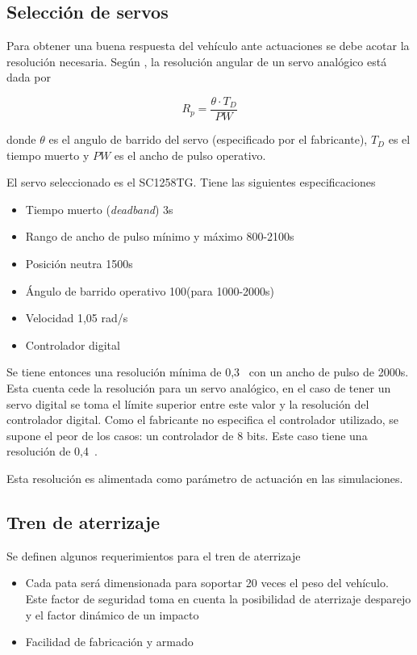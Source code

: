 \subsection{Selección de servos} \label{ssec:servoSeleccion}

Para obtener una buena respuesta del vehículo ante actuaciones se debe acotar la resolución necesaria. Según \cite{castillo2018efectos}, la resolución angular de un servo analógico está dada por


\[
R_p = \frac{\theta \cdot T_D}{PW}  
\]

donde $\theta$ es el angulo de barrido del servo (especificado por el fabricante), $T_D$ es el tiempo muerto y $PW$ es el ancho de pulso operativo. 

El servo seleccionado es el SC1258TG. Tiene las siguientes especificaciones

\begin{itemize}
    \item Tiempo muerto (\textit{deadband}) 3\micro s
    \item Rango de ancho de pulso mínimo y máximo 800-2100\micro s
    \item Posición neutra 1500\micro s
    \item Ángulo de barrido operativo 100\grad (para 1000-2000\micro s)
    \item Velocidad 1,05 rad/s
    \item Controlador digital
\end{itemize}

Se tiene entonces una resolución mínima de 0,3\grad~ con un ancho de pulso de 2000\micro s. Esta cuenta cede la resolución para un servo analógico, en el caso de tener un servo digital se toma el límite superior entre este valor y la resolución del controlador digital. Como el fabricante no especifica el controlador utilizado, se supone el peor de los casos: un controlador de 8 bits. Este caso tiene una resolución de 0,4\grad~.

Esta resolución es alimentada como parámetro de actuación en las simulaciones.

\subsection{Tren de aterrizaje}
Se definen algunos requerimientos para el tren de aterrizaje
\begin{itemize}
    \item Cada pata será dimensionada para soportar 20 veces el peso del vehículo. Este factor de seguridad toma en cuenta la posibilidad de aterrizaje desparejo y el factor dinámico de un impacto 
    \item Facilidad de fabricación y armado
\end{itemize}


